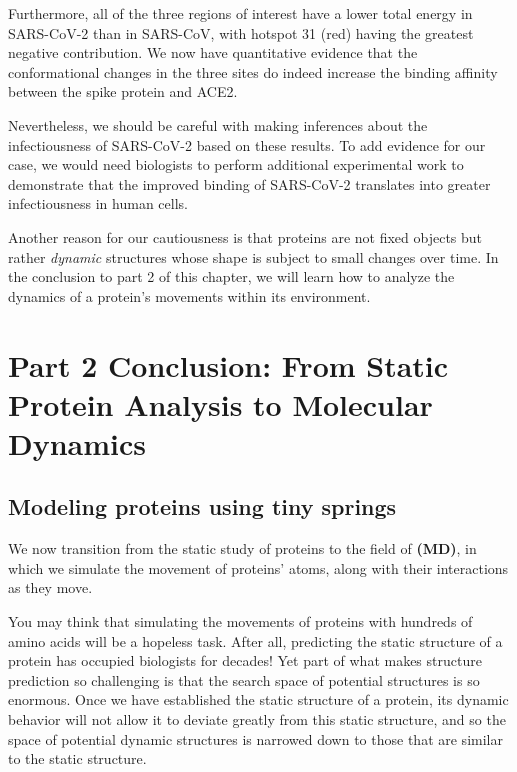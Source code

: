 Furthermore, all of the three regions of interest have a lower total energy in SARS-CoV-2 than in SARS-CoV, with hotspot 31 (red) having the greatest negative contribution. We now have quantitative evidence that the conformational changes in the three sites do indeed increase the binding affinity between the spike protein and ACE2.

Nevertheless, we should be careful with making inferences about the infectiousness of SARS-CoV-2 based on these results. To add evidence for our case, we would need biologists to perform additional experimental work to demonstrate that the improved binding of SARS-CoV-2 translates into greater infectiousness in human cells.

Another reason for our cautiousness is that proteins are not fixed objects but rather \textit{dynamic} structures whose shape is subject to small changes over time. In the conclusion to part 2 of this chapter, we will learn how to analyze the dynamics of a protein's movements within its environment.\\

\FloatBarrier
{}

\section{Part 2 Conclusion: From Static Protein Analysis to Molecular Dynamics}
\label{sec:conclusion_part_2}
\subsection{Modeling proteins using tiny springs}

We now transition from the static study of proteins to the field of  \textbf{(MD)}, in which we simulate the movement of proteins' atoms, along with their interactions as they move.

You may think that simulating the movements of proteins with hundreds of amino acids will be a hopeless task. After all, predicting the static structure of a protein has occupied biologists for decades! Yet part of what makes structure prediction so challenging is that the search space of potential structures is so enormous. Once we have established the static structure of a protein, its dynamic behavior will not allow it to deviate greatly from this static structure, and so the space of potential dynamic structures is narrowed down to those that are similar to the static structure.

